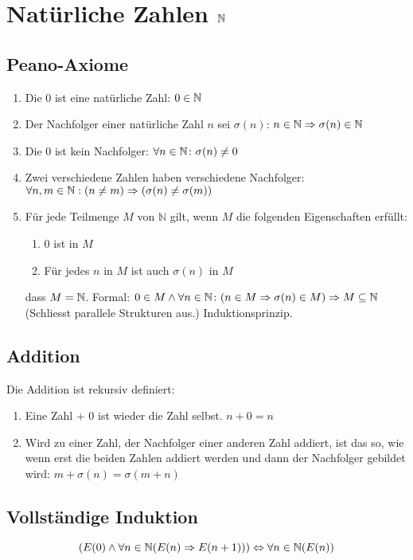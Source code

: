 \section{Natürliche Zahlen $\mathbb{N}$}
\subsection{Peano-Axiome}
\begin{enumerate}
\item Die 0 ist eine natürliche Zahl: $0 \in \mathbb{N}$
\item Der Nachfolger einer natürliche Zahl $n$ sei $\sigma(n)$: $n \in \mathbb{N} \Rightarrow \sigma(n) \in \mathbb{N}$
\item Die 0 ist kein Nachfolger: $\forall n \in \mathbb{N} \colon \sigma(n) \neq 0$
\item Zwei verschiedene Zahlen haben verschiedene Nachfolger: $\forall n, m \in \mathbb{N}: (n \neq m) \Rightarrow (\sigma(n) \neq \sigma(m))$
\item Für jede Teilmenge $M$ von $\mathbb{N}$ gilt, wenn $M$ die folgenden Eigenschaften erfüllt:
	\begin{enumerate}
		\item 0 ist in $M$
		\item Für jedes $n$ in $M$ ist auch $\sigma(n)$ in $M$
	\end{enumerate}
	dass $M = \mathbb{N}$. Formal: $0\in M \wedge \forall n \in \mathbb{N} \colon (n \in M \Rightarrow \sigma(n)\in M) \Rightarrow M \subseteq \mathbb{N}$\\
	(Schliesst parallele Strukturen aus.) Induktionsprinzip.
\end{enumerate}

\subsection{Addition}
Die Addition ist rekursiv definiert:
\begin{enumerate}
	\item Eine Zahl + 0 ist wieder die Zahl selbst. $n + 0 = n$
	\item Wird zu einer Zahl, der Nachfolger einer anderen Zahl addiert, ist das so, wie wenn
	erst die beiden Zahlen addiert werden und dann der Nachfolger gebildet wird: $m + \sigma(n) = \sigma(m + n)$
\end{enumerate}

\subsection{Vollständige Induktion}
\begin{equation*}
(E(0)
\wedge \forall n \in \mathbb{N} (E(n) \Rightarrow E(n + 1)))
\Leftrightarrow \forall n \in \mathbb{N} (E(n))
\end{equation*}

